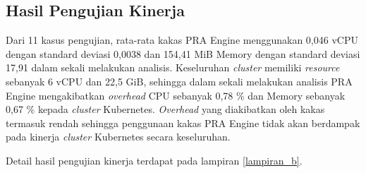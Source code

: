 \pagebreak

\subsection{Hasil Pengujian Kinerja} 
Dari 11 kasus pengujian, rata-rata kakas PRA Engine menggunakan 0,046 vCPU dengan standard deviasi 0,0038 dan 154,41 MiB Memory dengan standard deviasi 17,91 dalam sekali melakukan analisis. Keseluruhan \textit{cluster} memiliki \textit{resource} sebanyak 6 vCPU dan 22,5 GiB, sehingga dalam sekali melakukan analisis PRA Engine mengakibatkan \textit{overhead} CPU sebanyak 0,78 \% dan Memory sebanyak 0,67 \% kepada \textit{cluster} Kubernetes. \textit{Overhead} yang diakibatkan oleh kakas termasuk rendah sehingga penggunaan kakas PRA Engine tidak akan berdampak pada kinerja \textit{cluster} Kubernetes secara keseluruhan.

Detail hasil pengujian kinerja terdapat pada lampiran \ref{lampiran_b}.
                           
